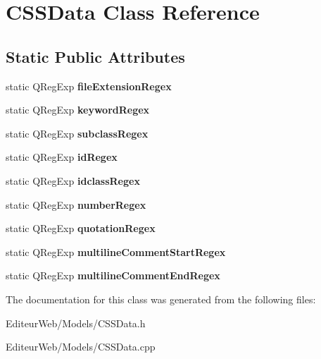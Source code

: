 \hypertarget{class_c_s_s_data}{
\section{CSSData Class Reference}
\label{class_c_s_s_data}
}
\subsection*{Static Public Attributes}
\begin{DoxyCompactItemize}
\item 
\hypertarget{class_c_s_s_data_a206d8ba55e436dd94091b4bb8a79e9c8}{
static QRegExp {\bfseries fileExtensionRegex}}
\label{class_c_s_s_data_a206d8ba55e436dd94091b4bb8a79e9c8}

\item 
\hypertarget{class_c_s_s_data_a4e42bbc5e8569b710377e26ff8b8dfaa}{
static QRegExp {\bfseries keywordRegex}}
\label{class_c_s_s_data_a4e42bbc5e8569b710377e26ff8b8dfaa}

\item 
\hypertarget{class_c_s_s_data_a79828ad5310402e1abfe41f779a3c7f9}{
static QRegExp {\bfseries subclassRegex}}
\label{class_c_s_s_data_a79828ad5310402e1abfe41f779a3c7f9}

\item 
\hypertarget{class_c_s_s_data_afc7752730b16b434f0eda0efc88fb6aa}{
static QRegExp {\bfseries idRegex}}
\label{class_c_s_s_data_afc7752730b16b434f0eda0efc88fb6aa}

\item 
\hypertarget{class_c_s_s_data_a33e5028c6dbc22cd5333a6cd6d95c94a}{
static QRegExp {\bfseries idclassRegex}}
\label{class_c_s_s_data_a33e5028c6dbc22cd5333a6cd6d95c94a}

\item 
\hypertarget{class_c_s_s_data_af24ae7869aad40677abbc4354116cf22}{
static QRegExp {\bfseries numberRegex}}
\label{class_c_s_s_data_af24ae7869aad40677abbc4354116cf22}

\item 
\hypertarget{class_c_s_s_data_a1a90309c5540c7b3ca0f721ca431d752}{
static QRegExp {\bfseries quotationRegex}}
\label{class_c_s_s_data_a1a90309c5540c7b3ca0f721ca431d752}

\item 
\hypertarget{class_c_s_s_data_a643222baacc96f37d2562009d841345c}{
static QRegExp {\bfseries multilineCommentStartRegex}}
\label{class_c_s_s_data_a643222baacc96f37d2562009d841345c}

\item 
\hypertarget{class_c_s_s_data_adb23235bee1ab0d4e0faaa60330799e1}{
static QRegExp {\bfseries multilineCommentEndRegex}}
\label{class_c_s_s_data_adb23235bee1ab0d4e0faaa60330799e1}

\end{DoxyCompactItemize}


The documentation for this class was generated from the following files:\begin{DoxyCompactItemize}
\item 
EditeurWeb/Models/CSSData.h\item 
EditeurWeb/Models/CSSData.cpp\end{DoxyCompactItemize}
